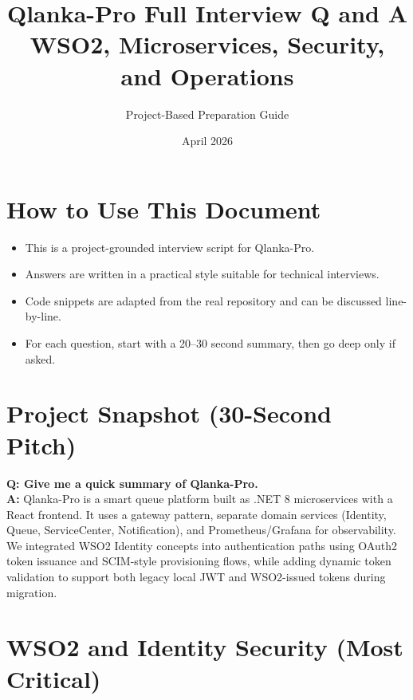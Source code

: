 \documentclass[11pt,a4paper]{article}
\title{Qlanka-Pro Full Interview Q and A\\\large WSO2, Microservices, Security, and Operations}
\author{Project-Based Preparation Guide}
\date{April 2026}
\begin{document}
\maketitle
\tableofcontents
\newpage

\section{How to Use This Document}
\begin{itemize}[leftmargin=*]
  \item This is a project-grounded interview script for Qlanka-Pro.
  \item Answers are written in a practical style suitable for technical interviews.
  \item Code snippets are adapted from the real repository and can be discussed line-by-line.
  \item For each question, start with a 20--30 second summary, then go deep only if asked.
\end{itemize}

\section{Project Snapshot (30-Second Pitch)}
\textbf{Q: Give me a quick summary of Qlanka-Pro.}\\
\textbf{A:} Qlanka-Pro is a smart queue platform built as .NET 8 microservices with a React frontend. It uses a gateway pattern, separate domain services (Identity, Queue, ServiceCenter, Notification), and Prometheus/Grafana for observability. We integrated WSO2 Identity concepts into authentication paths using OAuth2 token issuance and SCIM-style provisioning flows, while adding dynamic token validation to support both legacy local JWT and WSO2-issued tokens during migration.

\section{WSO2 and Identity Security (Most Critical)}
\end{document}
